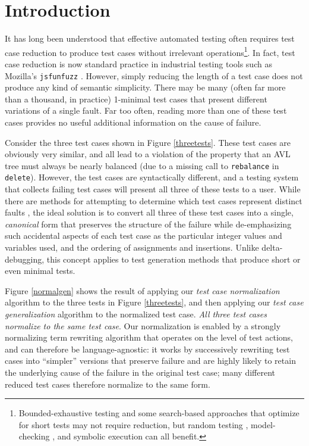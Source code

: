 \section{Introduction}

It has long been understood that effective automated testing often requires
test case reduction \cite{DD,MinUnit,TCminim,ICSEDiff} to produce test cases
without irrelevant operations\footnote{Bounded-exhaustive testing
  \cite{SoftBET} and some search-based approaches that
  optimize for short tests \cite{FA11} may not require reduction, but random
  testing \cite{RandFormal,HamletOnly}, model-checking
  \cite{Gastin04minimizationof}, and symbolic execution \cite{issta14}
  can all benefit.}.  In fact, test case reduction is
now standard practice in industrial testing tools such as Mozilla's
{\tt jsfunfuzz} \cite{jsfunfuzz,jsfunfuzz2,lithium}.  However, simply reducing the length of a test case
does not produce any kind of semantic simplicity.  There may be many
(often far more than a thousand, in practice) 1-minimal test cases
that present different variations of a single fault.  Far too often,
reading more than one of these test cases provides no useful
additional information on the cause of failure. 

Consider the three test cases shown in Figure \ref{threetests}.  These
test cases are obviously very similar, and all lead to a
violation of the property that an AVL tree must always be nearly
balanced (due to a missing call to {\tt rebalance} in {\tt delete}).  However, the test cases are
syntactically different, and a testing system that collects
failing test cases will present all three of these tests to a user.
While there are methods for attempting to determine which test cases
represent distinct faults \cite{PLDI13}, the ideal solution is
to convert all three of these test cases into a single,
\emph{canonical} form that preserves the structure of the failure while de-emphasizing
such accidental aspects of each test case as the particular integer
values and variables used, and the ordering of assignments and
insertions.  Unlike delta-debugging, this concept applies to 
test generation methods that produce short or even minimal tests.

Figure \ref{normalgen} shows the result of applying our \emph{test
  case normalization} algorithm to the three tests in Figure
\ref{threetests}, and then applying our \emph{test case
  generalization} algorithm to the normalized test case.  \emph{All
  three test cases normalize to the same test case}.  Our normalization is
enabled by a strongly normalizing term rewriting algorithm that operates
on the level of test actions, and can therefore be language-agnostic:
it works by successively rewriting test cases into ``simpler''
versions that preserve failure and are highly likely to retain the
underlying cause of the failure in the original test case; many
different reduced test cases therefore normalize to the same form.

